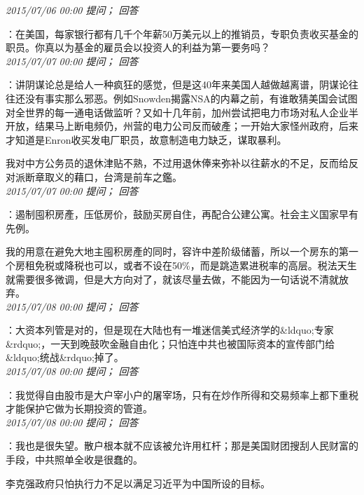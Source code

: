 \documentclass[twocolumn]{ctexart}
\begin{document}
\textit{\hfill\noindent\small 2015/07/06 00:00 提问； 回答}

：在美国，每家银行都有几千个年薪50万美元以上的推销员，专职负责收买基金的职员。你真以为基金的雇员会以投资人的利益为第一要务吗？\\

\textit{\hfill\noindent\small 2015/07/07 00:00 提问； 回答}

：讲阴谋论总是给人一种疯狂的感觉，但是这40年来美国人越做越离谱，阴谋论往往还没有事实那么邪恶。例如Snowden揭露NSA的内幕之前，有谁敢猜美国会试图对全世界的每一通电话做监听？又如十几年前，加州尝试把电力市场对私人企业半开放，结果马上断电频仍，州营的电力公司反而破產；一开始大家怪州政府，后来才知道是Enron收买发电厂职员，故意制造电力缺乏，谋取暴利。

我对中方公务员的退休津贴不熟，不过用退休俸来弥补以往薪水的不足，反而给反对派断章取义的藉口，台湾是前车之鑑。\\

\textit{\hfill\noindent\small 2015/07/07 00:00 提问； 回答}

：遏制囤积房產，压低房价，鼓励买房自住，再配合公建公寓。社会主义国家早有先例。

我的用意在避免大地主囤积房產的同时，容许中差阶级储蓄，所以一个房东的第一个房租免税或降税也可以，或者不设在50\%，而是跳造累进税率的高层。税法天生就需要很多微调，但是大方向对了，就该尽量去做，不能因为一句话说不清就放弃。\\

\textit{\hfill\noindent\small 2015/07/08 00:00 提问； 回答}

：大资本列管是对的，但是现在大陆也有一堆迷信美式经济学的\&ldquo;专家\&rdquo;，一天到晚鼓吹金融自由化；只怕连中共也被国际资本的宣传部门给\&ldquo;统战\&rdquo;掉了。\\

\textit{\hfill\noindent\small 2015/07/08 00:00 提问； 回答}

：我觉得自由股市是大户宰小户的屠宰场，只有在炒作所得和交易频率上都下重税才能保护它做为长期投资的管道。\\

\textit{\hfill\noindent\small 2015/07/08 00:00 提问； 回答}

：我也是很失望。散户根本就不应该被允许用杠杆；那是美国财团搜刮人民财富的手段，中共照单全收是很蠢的。

李克强政府只怕执行力不足以满足习近平为中国所设的目标。\\
\end{document}
